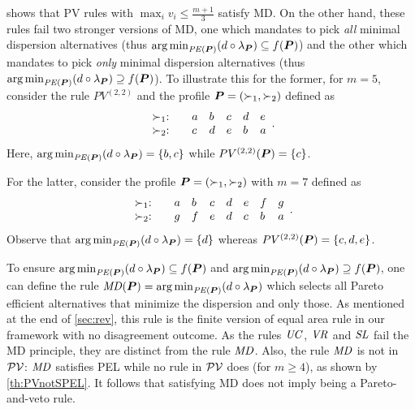 \documentclass[pagesize, twoside=off, bibliography=totoc, DIV=calc, fontsize=12pt, a4paper]{scrartcl}
\begin{document}

\begin{remark}
   shows that PV rules with $\max_i v_i ≤ \frac{m + 1}{3}$ satisfy MD. On the other hand, these rules fail two stronger versions of MD, one which mandates to pick \emph{all} minimal dispersion alternatives (thus $\argmin_{\PE} (d \circ \lprof) \subseteq f(\prof)$) and the other which mandates to pick \emph{only} minimal dispersion alternatives (thus $\argmin_{\PE} (d \circ \lprof) \supseteq f(\prof)$). To illustrate this for the former, for $m = 5$, consider the rule $PV^{(2, 2)}$ and the profile $\bm{P} = (\succ_1, \succ_2)$ defined as
  \begin{equation}
    \begin{array}{l @{:\hskip 2em} *5{l}}
      \pref_1 & a & b & c & d & e \\
      \pref_2 & c & d & e & b & a \\
    \end{array}.
  \end{equation}
  Here, $\argmin_{\PE} (d \circ \lprof) = \set{b, c}$ while $PV^{(2, 2)}(\bm{P}) = \{c\}$.

  For the latter, consider the profile $\bm{P} = (\succ_1, \succ_2)$ with $m=7$ defined as
  \begin{equation}
    \begin{array}{l @{:\hskip 2em} *7{l}}
      \pref_1 & a & b & c & d & e & f & g \\
      \pref_2 & g & f & e & d & c & b & a \\
    \end{array}.
  \end{equation}
  Observe that $\argmin_{\PE} (d \circ \lprof) = \set{d}$ whereas $PV^{(2, 2)}(\bm{P})=\{c,d,e\}$.
\end{remark}

\begin{remark}
  To ensure $\argmin_{\PE} (d \circ \lprof) \subseteq f(\prof)$ and $\argmin_{\PE} (d \circ \lprof) \supseteq f(\prof)$, one can define the rule $\MD(\prof) = \argmin_{\PE}(d \circ \lprof)$ which selects all Pareto efficient alternatives that minimize the dispersion and only those. As mentioned at the end of \cref{sec:rev}, this rule is the finite version of  equal area rule in our framework with no disagreement outcome.
  As the rules $\mathit{UC}$, $\mathit{VR}$ and $\mathit{SL}$ fail the MD principle, they are distinct from the rule $\mathit{MD}$. Also, the rule $\mathit{MD}$ is not in $\mathcal{PV}$: $\mathit{MD}$ satisfies PEL while no rule in $\mathcal{PV}$ does (for $m ≥ 4$), as shown by \cref{th:PVnotSPEL}. It follows that satisfying MD does not imply being a Pareto-and-veto rule.
\end{remark}
\end{document}
